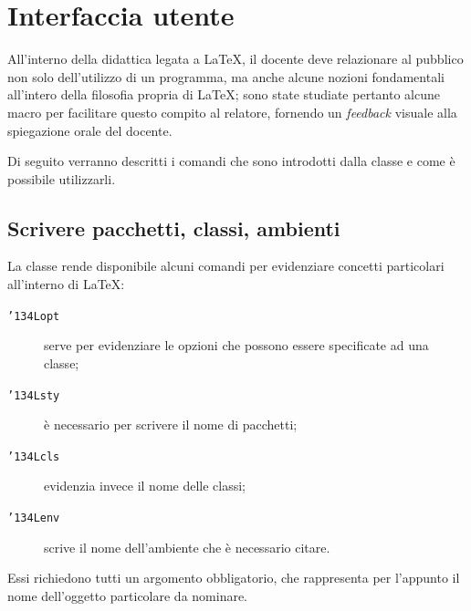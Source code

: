 \documentclass[a4paper,10pt]{article}
\newcommand{\bs}{{\char'134}}%
\newcommand{\cmd}[1]{\texttt{\bs #1}}
\begin{document}
\section{Interfaccia utente}
All'interno della didattica legata a \LaTeX, il docente deve
relazionare al pubblico non solo dell'utilizzo di un programma, ma
anche alcune nozioni fondamentali all'intero della filosofia propria
di \LaTeX; sono state studiate pertanto alcune macro per facilitare
questo compito al relatore, fornendo un \textit{feedback} visuale alla
spiegazione orale del docente.

Di seguito verranno descritti i comandi che sono introdotti dalla
classe e come è possibile utilizzarli.

\subsection{Scrivere pacchetti, classi, ambienti}
La classe rende disponibile alcuni comandi per evidenziare concetti
particolari all'interno di \LaTeX:
\begin{description}
	\item[\cmd{Lopt}]serve per evidenziare le opzioni che
		possono essere specificate ad una classe;
	\item[\cmd{Lsty}]è necessario per scrivere il nome di
	  pacchetti;
	\item[\cmd{Lcls}]evidenzia invece il nome delle classi;
	\item[\cmd{Lenv}]scrive il nome dell'ambiente che è
		necessario citare.
\end{description}
Essi richiedono tutti un argomento obbligatorio, che rappresenta per
l'appunto il nome dell'oggetto particolare da nominare.
\end{document}
